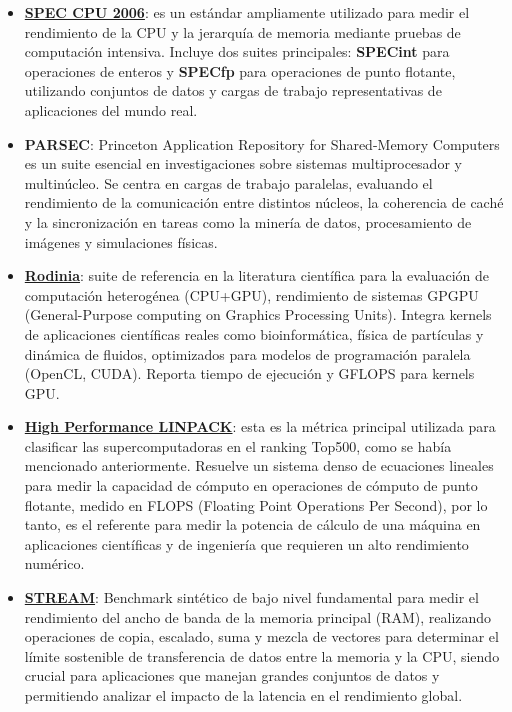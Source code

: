 \documentclass[11pt,a4paper]{article}
\begin{document}
\begin{itemize}
    \item \textbf{\href{https://www.spec.org/cpu2006/}{SPEC CPU 2006}\parencite{spec2006}}: es un estándar ampliamente utilizado para medir el rendimiento de la CPU y la jerarquía de memoria mediante pruebas de computación 
    intensiva. Incluye dos suites principales: \textbf{SPECint} para operaciones de enteros y \textbf{SPECfp} para operaciones de punto flotante, utilizando conjuntos de datos y cargas de trabajo representativas de aplicaciones 
    del mundo real.
    
    \item \textbf{PARSEC\parencite{bienia2008parsec}}: Princeton Application Repository for Shared-Memory Computers es un suite esencial en investigaciones sobre sistemas multiprocesador y multinúcleo. Se centra en cargas 
    de trabajo paralelas, evaluando el rendimiento de la comunicación entre distintos núcleos, la coherencia de caché y la sincronización en tareas como la minería de datos, procesamiento de imágenes y simulaciones físicas.
    
    \item \textbf{\href{https://openbenchmarking.org/test/pts/rodinia}{Rodinia}\parencite{che2009rodinia}}: suite de referencia en la literatura científica para la evaluación de computación heterogénea (CPU+GPU), rendimiento de sistemas GPGPU (General-Purpose computing on Graphics Processing Units). Integra kernels de aplicaciones científicas reales como bioinformática, física de partículas y dinámica de fluidos, optimizados para modelos de programación paralela (OpenCL, CUDA). Reporta tiempo de ejecución y GFLOPS para kernels GPU.
    
    \item \textbf{\href{https://openbenchmarking.org/test/pts/hpl}{High Performance LINPACK}\parencite{hpl}}: esta es la métrica principal utilizada para clasificar las supercomputadoras en el ranking Top500, como se había mencionado 
    anteriormente. Resuelve un sistema denso de ecuaciones lineales para medir la capacidad de cómputo en operaciones de cómputo de punto flotante, medido en FLOPS (Floating Point Operations Per Second), por lo tanto, es 
    el referente para medir la potencia de cálculo de una máquina en aplicaciones científicas y de ingeniería que requieren un alto rendimiento numérico.
    
    \item \textbf{\href{https://openbenchmarking.org/test/pts/stream}{STREAM}\parencite{mccalpin1995stream}}: Benchmark sintético de bajo nivel fundamental para medir el rendimiento del ancho de banda de la memoria principal (RAM), realizando operaciones
    de copia, escalado, suma y mezcla de vectores para determinar el límite sostenible de transferencia de datos entre la memoria y la CPU, siendo crucial para aplicaciones que manejan grandes conjuntos de datos y 
    permitiendo analizar el impacto de la latencia en el rendimiento global.
\end{itemize}
\end{document}
